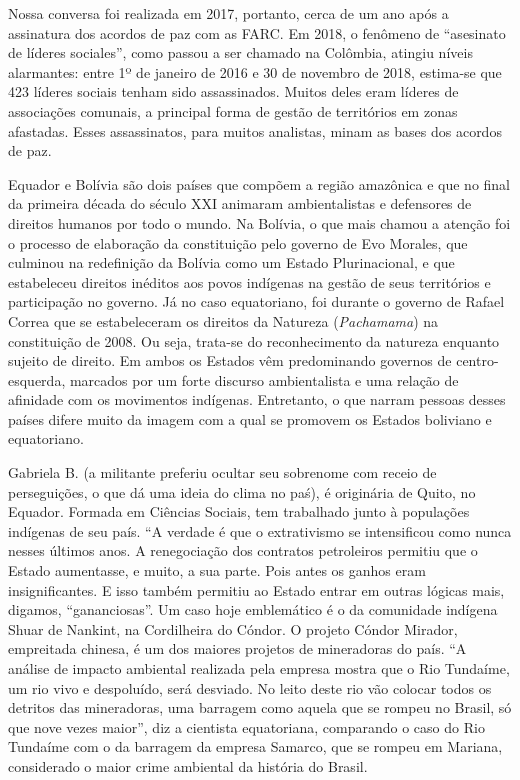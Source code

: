 Nossa conversa foi realizada em 2017, portanto, cerca de um ano após a
assinatura dos acordos de paz com as FARC. Em 2018, o fenômeno de
``asesinato de líderes sociales'', como passou a ser chamado na
Colômbia, atingiu níveis alarmantes: entre 1º de
janeiro de 2016 e 30 de novembro de 2018, estima-se que 423 líderes
sociais tenham sido assassinados. Muitos deles eram líderes de
associações comunais, a principal forma de gestão de territórios em
zonas afastadas. Esses assassinatos, para muitos analistas, minam as
bases dos acordos de paz.

Equador e Bolívia são dois países que compõem a região amazônica e que
no final da primeira década do século XXI animaram ambientalistas e
defensores de direitos humanos por todo o mundo. Na Bolívia, o que mais
chamou a atenção foi o processo de elaboração da constituição pelo
governo de Evo Morales, que culminou na redefinição da Bolívia como um
Estado Plurinacional, e que estabeleceu direitos inéditos aos povos
indígenas na gestão de seus territórios e participação no governo. Já no
caso equatoriano, foi durante o governo de Rafael Correa que se
estabeleceram os direitos da Natureza (\emph{Pachamama}) na constituição
de 2008. Ou seja, trata-se do reconhecimento da natureza enquanto
sujeito de direito. Em ambos os Estados vêm predominando governos de
centro-esquerda, marcados por um forte discurso ambientalista e uma
relação de afinidade com os movimentos indígenas. Entretanto, o que
narram pessoas desses países difere muito da imagem com a qual se
promovem os Estados boliviano e equatoriano.

Gabriela B. (a militante preferiu ocultar seu sobrenome com receio de
perseguições, o que dá uma ideia do clima no paś), é originária de
Quito, no Equador. Formada em Ciências Sociais, tem trabalhado junto à
populações indígenas de seu país. ``A verdade é que o extrativismo se
intensificou como nunca nesses últimos anos. A renegociação dos
contratos petroleiros permitiu que o Estado aumentasse, e muito, a sua
parte. Pois antes os ganhos eram insignificantes. E isso também permitiu
ao Estado entrar em outras lógicas mais, digamos, ``gananciosas''. Um
caso hoje emblemático é o da comunidade indígena Shuar de Nankint, na
Cordilheira do Cóndor. O projeto Cóndor Mirador, empreitada chinesa, é
um dos maiores projetos de mineradoras do país. ``A análise de impacto
ambiental realizada pela empresa mostra que o Rio Tundaíme, um rio vivo
e despoluído, será desviado. No leito deste rio vão colocar todos os
detritos das mineradoras, uma barragem como aquela que se rompeu no
Brasil, só que nove vezes maior'', diz a cientista equatoriana,
comparando o caso do Rio Tundaíme com o da barragem da empresa Samarco,
que se rompeu em Mariana, considerado o maior crime ambiental da
história do Brasil.

